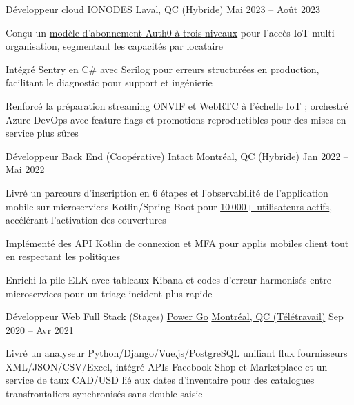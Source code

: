 \begin{cventries}
\cventry
{Développeur cloud} %
{\href{https://www.ionodes.com/}{IONODES}} %
{\href{https://www.google.com/maps/search/?api=1\&query=Laval,+QC,+Canada}{Laval, QC (Hybride)}} %
{Mai 2023 -- Août 2023} %
{
\begin{cvitems}
\item {Conçu un \uline{modèle d'abonnement Auth0 à trois niveaux} pour l'accès IoT multi-organisation, segmentant les capacités par locataire}
\item {Intégré Sentry en C\# avec Serilog pour erreurs structurées en production, facilitant le diagnostic pour support et ingénierie}
\item {Renforcé la préparation streaming ONVIF et WebRTC à l'échelle IoT ; orchestré Azure DevOps avec feature flags et promotions reproductibles pour des mises en service plus sûres}
\end{cvitems}
}

\cventry
{Développeur Back End (Coopérative)} %
{\href{https://www.intact.ca/}{Intact}} %
{\href{https://www.google.com/maps/search/?api=1\&query=Montreal,+QC,+Canada}{Montréal, QC (Hybride)}} %
{Jan 2022 -- Mai 2022} %
{
\begin{cvitems}
\item {Livré un parcours d'inscription en 6 étapes et l'\mbox{observabilité} de l'application mobile sur microservices Kotlin/Spring Boot pour \href{https://www.intact.ca/fr/assurances-particulieres/services-en-ligne/application-mobile}{\uline{10\,000+ utilisateurs actifs}}, accélérant l'activation des couvertures}
\item {Implémenté des API Kotlin de connexion et MFA pour applis mobiles client tout en respectant les politiques}
\item {Enrichi la pile ELK avec tableaux Kibana et codes d'erreur harmonisés entre microservices pour un triage incident plus rapide}
\end{cvitems}
}

\cventry
{Développeur Web Full Stack (Stages)} %
{\href{https://www.powergo.ca/}{Power Go}} %
{\href{https://www.google.com/maps/search/?api=1\&query=Montreal,+QC,+Canada}{Montréal, QC (Télétravail)}} %
{Sep 2020 -- Avr 2021} %
{
\begin{cvitems}
\item {Livré un analyseur Python/Django/Vue.js/PostgreSQL unifiant flux fournisseurs XML/JSON/CSV/Excel, intégré APIs Facebook Shop et Marketplace et un service de taux CAD/USD lié aux dates d'inventaire pour des catalogues transfrontaliers synchronisés sans double saisie}
\end{cvitems}
}


\end{cventries}
